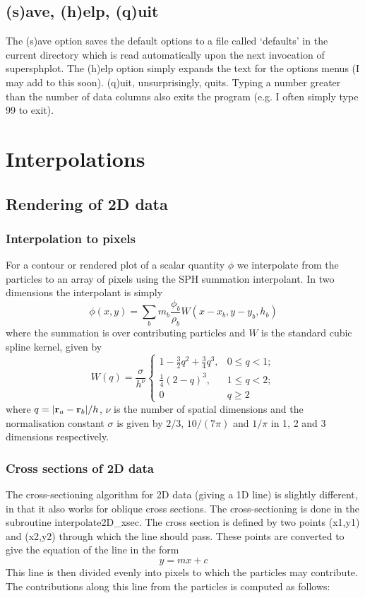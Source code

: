 \documentclass[a4paper,11pt]{article}
\begin{document}
\subsection{(s)ave, (h)elp, (q)uit}
 The (s)ave option saves the default options to a file called `defaults' in the
current directory which is read automatically upon the next invocation of
supersphplot. The (h)elp option simply expands the text for the options menus (I
may add to this soon). (q)uit, unsurprisingly, quits. Typing a number greater than the number of
data columns also exits the program (e.g. I often simply type 99 to exit).

\section{Interpolations}

\subsection{Rendering of 2D data}
\subsubsection{Interpolation to pixels}
 For a contour or rendered plot of a scalar quantity $\phi$ we
interpolate from the particles to an array of pixels using the SPH summation
interpolant. In two dimensions the interpolant is simply
\begin{equation}
\phi(x,y) = \sum_b m_b \frac{\phi_b}{\rho_b} W(x - x_b, y-y_b, h_b)
\end{equation}
where the summation is over contributing particles and $W$ is the standard cubic spline kernel, given by
\begin{equation}
W(q) = \frac{\sigma}{h^\nu}\left\{ \begin{array}{ll}
1 - \frac{3}{2}q^2 + \frac{3}{4}q^3, & 0 \le q < 1; \\
\frac{1}{4}(2-q)^3, & 1 \le q < 2; \\
0 & q \ge 2 \end{array} \right.
\end{equation}
where $q = \vert {\bf r}_a - {\bf r}_b \vert / h$, $\nu$ is the number of spatial
dimensions and the normalisation constant $\sigma$ is given by $2/3$, $10/(7\pi)$ and $1/\pi$ in
1, 2 and 3 dimensions respectively.

\subsubsection{Cross sections of 2D data}
The cross-sectioning algorithm for 2D data (giving a 1D line) is slightly
different, in that it also works for oblique cross sections. The
cross-sectioning is done in the subroutine interpolate2D\_xsec. The cross
section is defined by two points (x1,y1) and (x2,y2) through which the line
should pass. These points are converted to give the equation of the line in the
form
\begin{equation}
y = mx + c
\end{equation}
This line is then divided evenly into pixels to which the particles
may contribute. The contributions along this line from the particles is computed
as follows: 
\end{document}
